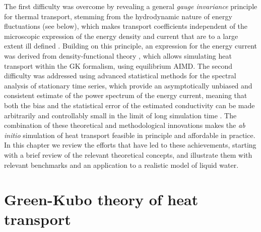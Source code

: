 The first difficulty was overcome by revealing a general \emph{gauge invariance} principle for thermal transport, stemming from the hydrodynamic nature of energy fluctuations (see below), which makes transport coefficients independent of the microscopic expression of the energy density and current that are to a large extent ill defined \citep{Marcolongo2016,Ercole2016}. Building on this principle, an expression for the energy current was derived from density-functional theory \citep{Hohenberg1964,Kohn1965}, which allows simulating heat transport within the GK formalism, using equilibrium AIMD. The second difficulty was addressed using advanced statistical methods for the spectral analysis of stationary time series, which provide an asymptotically unbiased and consistent estimate of the power spectrum of the energy current, meaning that both the bias and the statistical error of the estimated conductivity can be made arbitrarily and controllably small in the limit of long simulation time \citep{Ercole2017}. The combination of these theoretical and methodological innovations makes the \emph{ab initio} simulation of heat transport feasible in principle and affordable in practice. In this chapter we review the efforts that have led to these achievements, starting with a brief review of the relevant theoretical concepts, and illustrate them with relevant benchmarks and an application to a realistic model of liquid water.

\section{Green-Kubo theory of heat transport}

